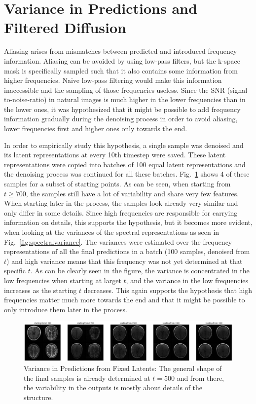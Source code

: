 \section{Variance in Predictions and Filtered Diffusion}
\label{sec:predvariance}
Aliasing arises from mismatches between predicted and introduced frequency information. Aliasing can be avoided by using low-pass filters, but the k-space mask is specifically sampled such that it also contains some information from higher frequencies. Naive low-pass filtering would make this information inaccessible and the sampling of those frequencies useless. Since the SNR (signal-to-noise-ratio) in natural images is much higher in the lower frequencies than in the lower ones, it was hypothesized that it might be possible to add frequency information gradually during the denoising process in order to avoid aliasing, lower frequencies first and higher ones only towards the end.

In order to empirically study this hypothesis, a single sample was denoised and its latent representations at every 10th timestep were saved. These latent representations were copied into batches of 100 equal latent representations and the denoising process was continued for all these batches. Fig.~\ref{fig:predvariance} shows 4 of these samples for a subset of starting points. As can be seen, when starting from $t\geq700$, the samples still have a lot of variability and share very few features. When starting later in the process, the samples look already very similar and only differ in some details. Since high frequencies are responsible for carrying information on details, this supports the hypothesis, but it becomes more evident, when looking at the variances of the spectral representations as seen in Fig.~\ref{fig:spectralvariance}. The variances were estimated over the frequency representations of all the final predictions in a batch (100 samples, denoised from $t$) and high variance means that this frequency was not yet determined at that specific $t$. As can be clearly seen in the figure, the variance is concentrated in the low frequencies when starting at larget $t$, and the variance in the low frequencies increases as the starting $t$ decreases. This again supports the hypothesis that high frequencies matter much more towards the end and that it might be possible to only introduce them later in the process.
\begin{figure}[h]
    \centering
    \includegraphics[width=.75\textwidth]{images/fixedlatents_variance.png}
    \caption[Variance in Predictions from Fixed Latents]{Variance in Predictions from Fixed Latents: The general shape of the final samples is already determined at $t=500$ and from there, the variability in the outputs is mostly about details of the structure.}
    \label{fig:predvariance}
\end{figure}

